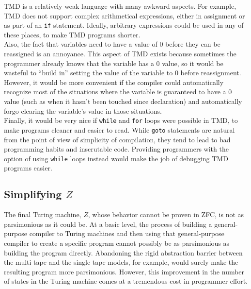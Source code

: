 \documentclass[11pt]{report}
\begin{document}
TMD is a relatively weak language with many awkward aspects. For example, TMD does not support complex arithmetical expressions, either in assignment or as part of an \texttt{if} statement. Ideally, arbitrary expressions could be used in any of these places, to make TMD programs shorter. \\

Also, the fact that variables need to have a value of 0 before they can be reassigned is an annoyance. This aspect of TMD exists because sometimes the programmer already knows that the variable has a 0 value, so it would be wasteful to ``build in'' setting the value of the variable to 0 before reassignment. However, it would be more convenient if the compiler could automatically recognize most of the situations where the variable is guaranteed to have a 0 value (such as when it hasn't been touched since declaration) and automatically forgo clearing the variable's value in those situations. \\

Finally, it would be very nice if \texttt{while} and \texttt{for} loops were possible in TMD, to make programs cleaner and easier to read. While \texttt{goto} statements are natural from the point of view of simplicity of compilation, they tend to lead to bad programming habits and inscrutable code. Providing programmers with the option of using \texttt{while} loops instead would make the job of debugging TMD programs easier. 

\subsection{Simplifying $Z$}

The final Turing machine, $Z$, whose behavior cannot be proven in ZFC, is not as parsimonious as it could be. At a basic level, the process of building a general-purpose compiler to Turing machines and then using that general-purpose compiler to create a specific program cannot possibly be as parsimonious as building the program directly. Abandoning the rigid abstraction barrier between the multi-tape and the single-tape models, for example, would surely make the resulting program more parsimonious. However, this improvement in the number of states in the Turing machine comes at a tremendous cost in programmer effort. \\
\end{document}

